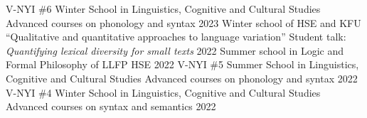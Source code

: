 

\begin{cvhonors}

  \cvhonor
    {V-NYI \#6 Winter School in Linguistics, Cognitive and Cultural Studies} %
    {Advanced courses on phonology and syntax} %
    {} %
    {2023} %
  \cvhonor
    {Winter school of HSE and KFU ``Qualitative and quantitative approaches to language variation''} %
    {Student talk: \emph{Quantifying lexical diversity for small texts}} %
    {} %
    {2022} %
  \cvhonor
    {Summer school in Logic and Formal Philosophy of LLFP HSE} %
    {} %
    {} %
    {2022} %
  \cvhonor
    {V-NYI \#5 Summer School in Linguistics, Cognitive and Cultural Studies} %
    {Advanced courses on phonology and syntax} %
    {} %
    {2022} %
  \cvhonor
    {V-NYI \#4 Winter School in Linguistics, Cognitive and Cultural Studies} %
    {Advanced courses on syntax and semantics} %
    {} %
    {2022} %
    
    
\end{cvhonors}


%
%
%
%
